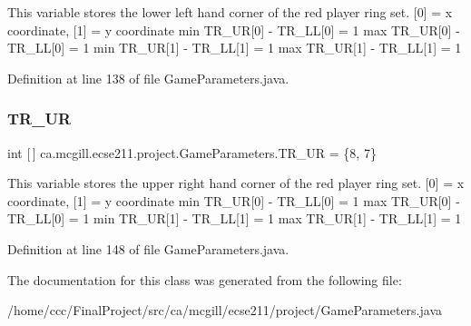 This variable stores the lower left hand corner of the red player ring set. \mbox{[}0\mbox{]} = x coordinate, \mbox{[}1\mbox{]} = y coordinate min T\+R\+\_\+\+UR\mbox{[}0\mbox{]} -\/ T\+R\+\_\+\+LL\mbox{[}0\mbox{]} = 1 max T\+R\+\_\+\+UR\mbox{[}0\mbox{]} -\/ T\+R\+\_\+\+LL\mbox{[}0\mbox{]} = 1 min T\+R\+\_\+\+UR\mbox{[}1\mbox{]} -\/ T\+R\+\_\+\+LL\mbox{[}1\mbox{]} = 1 max T\+R\+\_\+\+UR\mbox{[}1\mbox{]} -\/ T\+R\+\_\+\+LL\mbox{[}1\mbox{]} = 1 

Definition at line 138 of file Game\+Parameters.\+java.

\mbox{\label{classca_1_1mcgill_1_1ecse211_1_1project_1_1_game_parameters_a45c465e9f0b53a4e752a398036be13f5}} 
\subsubsection{\texorpdfstring{T\+R\+\_\+\+UR}{TR\_UR}}
{\footnotesize\ttfamily int \mbox{[}$\,$\mbox{]} ca.\+mcgill.\+ecse211.\+project.\+Game\+Parameters.\+T\+R\+\_\+\+UR = \{8, 7\}\hspace{0.3cm}{\ttfamily [static]}}

This variable stores the upper right hand corner of the red player ring set. \mbox{[}0\mbox{]} = x coordinate, \mbox{[}1\mbox{]} = y coordinate min T\+R\+\_\+\+UR\mbox{[}0\mbox{]} -\/ T\+R\+\_\+\+LL\mbox{[}0\mbox{]} = 1 max T\+R\+\_\+\+UR\mbox{[}0\mbox{]} -\/ T\+R\+\_\+\+LL\mbox{[}0\mbox{]} = 1 min T\+R\+\_\+\+UR\mbox{[}1\mbox{]} -\/ T\+R\+\_\+\+LL\mbox{[}1\mbox{]} = 1 max T\+R\+\_\+\+UR\mbox{[}1\mbox{]} -\/ T\+R\+\_\+\+LL\mbox{[}1\mbox{]} = 1 

Definition at line 148 of file Game\+Parameters.\+java.



The documentation for this class was generated from the following file\+:\begin{DoxyCompactItemize}
\item 
/home/ccc/\+Final\+Project/src/ca/mcgill/ecse211/project/Game\+Parameters.\+java\end{DoxyCompactItemize}
